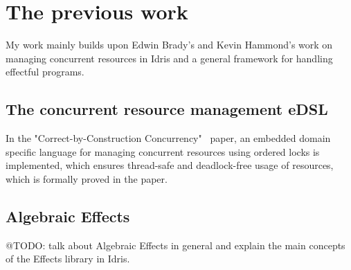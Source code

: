 \section{The previous work}

My work mainly builds upon Edwin Brady's and Kevin Hammond's work on managing
concurrent resources in Idris and a general framework for handling effectful
programs.

\subsection{The concurrent resource management eDSL}

In the "Correct-by-Construction Concurrency"~\cite{cbconc-fi} paper, an
embedded domain specific language for managing concurrent resources using
ordered locks is implemented, which ensures thread-safe and deadlock-free usage
of resources, which is formally proved in the paper.

\subsection{Algebraic Effects}

@TODO: talk about Algebraic Effects in general and explain the main concepts of
the Effects library in Idris.


